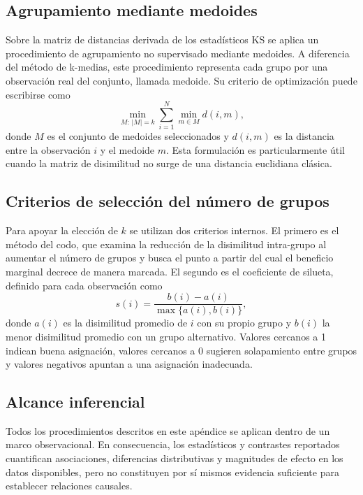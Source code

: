 \documentclass[10pt,letterpaper]{article} %
\numberwithin{figure}{subsection}
\begin{document}
\subsection{Agrupamiento mediante medoides}
Sobre la matriz de distancias derivada de los estadísticos KS se aplica un procedimiento de agrupamiento no supervisado mediante medoides. A diferencia del método de k-medias, este procedimiento representa cada grupo por una observación real del conjunto, llamada medoide. Su criterio de optimización puede escribirse como
\[
\min_{M:\,|M|=k}\sum_{i=1}^{N}\min_{m\in M} d(i,m),
\]
donde $M$ es el conjunto de medoides seleccionados y $d(i,m)$ es la distancia entre la observación $i$ y el medoide $m$. Esta formulación es particularmente útil cuando la matriz de disimilitud no surge de una distancia euclidiana clásica.

\subsection{Criterios de selección del número de grupos}
Para apoyar la elección de $k$ se utilizan dos criterios internos. El primero es el método del codo, que examina la reducción de la disimilitud intra-grupo al aumentar el número de grupos y busca el punto a partir del cual el beneficio marginal decrece de manera marcada. El segundo es el coeficiente de silueta, definido para cada observación como
\[
s(i)=\frac{b(i)-a(i)}{\max\{a(i),b(i)\}},
\]
donde $a(i)$ es la disimilitud promedio de $i$ con su propio grupo y $b(i)$ la menor disimilitud promedio con un grupo alternativo. Valores cercanos a 1 indican buena asignación, valores cercanos a 0 sugieren solapamiento entre grupos y valores negativos apuntan a una asignación inadecuada.

\subsection{Alcance inferencial}
Todos los procedimientos descritos en este apéndice se aplican dentro de un marco observacional. En consecuencia, los estadísticos y contrastes reportados cuantifican asociaciones, diferencias distributivas y magnitudes de efecto en los datos disponibles, pero no constituyen por sí mismos evidencia suficiente para establecer relaciones causales.
\end{document}
